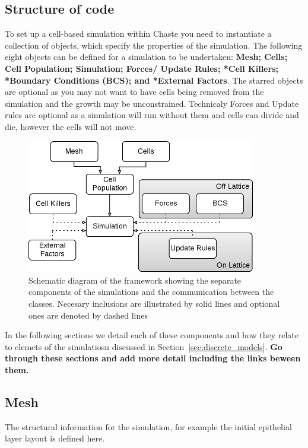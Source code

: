 \documentclass{siamltex}
\newcommand{\highlight}[1]{{\color{red} \bf{#1}}}
\begin{document}
\subsection{Structure of code} \label{sec:code}
To set up a cell-based simulation within Chaste you need to instantiate a collection of objects, which specify the properties of the simulation. 
The following eight objects can be defined for a simulation to be undertaken: \textbf{Mesh; Cells; Cell Population; Simulation; Forces/ Update Rules; *Cell Killers; *Boundary Conditions (BCS); and *External Factors}.
The starred objects are optional as you may not want to have cells being removed from the simulation and the growth may be unconstrained. Technicaly Forces and Update rules are optional as a simulation will run without them and cells can divide and die, however the cells will not move.

\begin{figure}[tbhp]
        \centering
        \includegraphics[width=10cm]{Figs/CellBasedStructure}
        \caption{Schematic diagram of the framework showing the separate components of the simulations and the communication between the classes. Necesary inclusions are illustrated by solid lines and optional ones are denoted by dashed lines} 
       \label{fig:SimulationComponents}
\end{figure}

In the following sections we detail each of these components and how they relate to elemets of the simulatiosn discussed in Section~\ref{sec:discrete_models}. \highlight{Go through these sections and add more detail including the links beween them.}

\subsection{Mesh} \label{sec:structure:mesh}
The structural information for the simulation, for example the initial epithelial layer layout is defined here.
\end{document}
